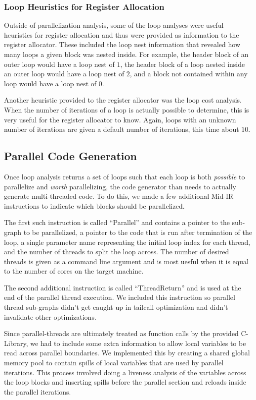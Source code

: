 \documentclass[11pt]{article}
\begin{document}
\subsubsection {Loop Heuristics for Register Allocation} 

Outside of parallelization analysis, some of the loop analyses were
useful heuristics for register allocation and thus were provided as
information to the register allocator. These included the loop nest
information that revealed how many loops a given block was nested
inside. For example, the header block of an outer loop would have a
loop nest of $1$, the header block of a loop nested inside an outer
loop would have a loop nest of $2$, and a block not contained within
any loop would have a loop nest of $0$. 

Another heuristic provided to the register allocator was the loop cost
analysis. When the number of iterations of a loop is actually possible
to determine, this is very useful for the register allocator to
know. Again, loops with an unknown number of iterations are given a
default number of iterations, this time about $10$.   

\subsection{Parallel Code Generation}

Once loop analysis returns a set of loops such that each loop is both
\emph{possible} to parallelize and \emph{worth} parallelizing, the
code generator than needs to actually generate multi-threaded code. To
do this, we made a few additional Mid-IR instructions to indicate
which blocks should be parallelized. 

The first such instruction is called ``Parallel'' and contains a
pointer to the sub-graph to be parallelized, a pointer to the code
that is run after termination of the loop, a single parameter name
representing the initial loop index for each thread, and the number of
threads to split the loop across. The number of desired threads is
given as a command line argument and is most uesful when it is equal
to the number of cores on the target machine. 

The second additional instruction is called ``ThreadReturn'' and is
used at the end of the parallel thread execution. We included this
instruction so parallel thread sub-graphs didn't get caught up in
tailcall optimization and didn't invalidate other optimizations. 

Since parallel-threads are ultimately treated as function calls by the
provided C-Library, we had to include some extra information to allow
local variables to be read across parallel boundaries. We implemented
this by creating a shared global memory pool to contain spills of
local variables that are used by parallel iterations. This process
involved doing a liveness analysis of the variables across the loop
blocks and inserting spills before the parallel section and reloads
inside the parallel iterations.  
\end{document}
